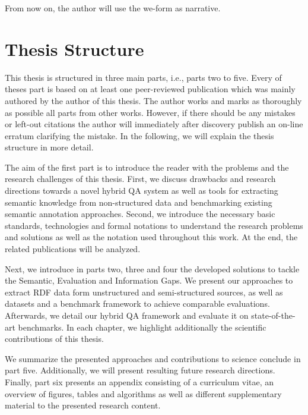 From now on, the author will use the we-form as narrative.


\section*{Thesis Structure}

This thesis is structured in three main parts, i.e., parts two to five.
Every of theses part is based on at least one peer-reviewed publication which was mainly authored by the author of this thesis.
The author works and marks as thoroughly as possible all parts from other works. 
However, if there should be any mistakes or left-out citations the author will immediately after discovery publish an on-line erratum clarifying the mistake. 
In the following, we will explain the thesis structure in more detail.

The aim of the first part is to introduce the reader with the problems and the research challenges of this thesis. 
First, we discuss drawbacks and research directions towards a novel hybrid \ac{QA} system as well as tools for extracting semantic knowledge from non-structured data and benchmarking existing semantic annotation approaches.
Second, we introduce the necessary basic standards, technologies and formal notations to understand the research problems and solutions as well as the notation used throughout this work.
At the end, the related publications will be analyzed.

Next, we introduce in parts two, three and four the developed solutions to tackle the Semantic, Evaluation and Information Gaps. 
We  present our approaches to extract \ac{RDF} data form unstructured and semi-structured sources, as well as datasets and a benchmark framework to achieve comparable evaluations. 
Afterwards, we detail our hybrid \ac{QA} framework and evaluate it on state-of-the-art benchmarks.
In each chapter, we highlight additionally the scientific contributions of this thesis.

We  summarize the presented approaches and contributions to science conclude in part five. 
Additionally, we will present resulting future research directions.
Finally, part six presents an appendix consisting of a curriculum vitae, an overview of figures, tables and algorithms as well as different supplementary material to the presented research content.
